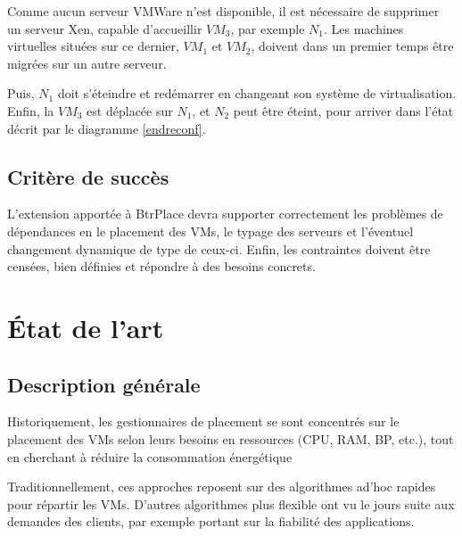 \documentclass[a4paper]{article}
\begin{document}
Comme aucun serveur VMWare n'est disponible, il est nécessaire de supprimer
un serveur Xen, capable d'accueillir $VM_3$, par exemple $N_1$. Les machines
virtuelles situées sur ce dernier, $VM_1$ et $VM_2$,  doivent dans un premier
temps être migrées sur un autre serveur.

Puis, $N_1$ doit s'éteindre et redémarrer en changeant son système
de virtualisation. Enfin, la $VM_3$ est déplacée sur $N_1$, et $N_2$ peut
être éteint, pour arriver dans l'état décrit par le diagramme \ref{endreconf}.

\subsection{Critère de succès}
L'extension apportée à BtrPlace devra supporter correctement les problèmes
de dépendances en le placement des VMs, le typage des serveurs et l'éventuel
changement dynamique de type de ceux-ci. Enfin, les contraintes doivent être
censées, bien définies et répondre à des besoins concrets.

\section{État de l'art}
\subsection{Description générale}
Historiquement, les gestionnaires de placement se sont concentrés sur
le placement des VMs selon leurs besoins en ressources (CPU, RAM, BP, etc.),
tout en cherchant à réduire la consommation énergétique

Traditionnellement, ces approches reposent sur des algorithmes ad'hoc rapides
pour répartir les VMs. D'autres algorithmes plus flexible ont vu le jours
suite aux demandes des clients, par exemple portant sur la fiabilité des
applications.
\end{document}
